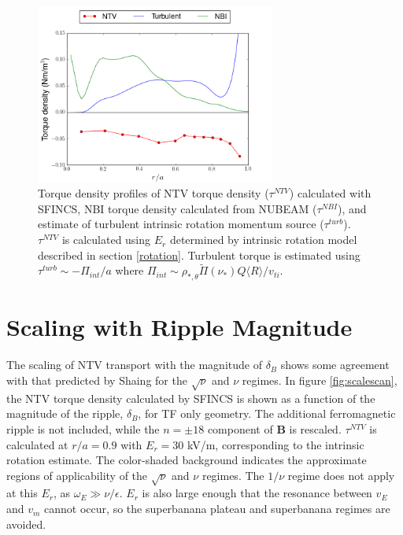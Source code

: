 \documentclass{article}
\numberwithin{figure}{section}
\numberwithin{equation}{section}
\begin{document}
\begin{figure}[h!]
\centering
\includegraphics[width=0.7\textwidth]{AllTorquePlot.png}
\caption{\label{fig:alltorque} Torque density profiles of NTV torque density ($\tau^{NTV}$) calculated with SFINCS, NBI torque density calculated from NUBEAM ($\tau^{NBI}$), and estimate of turbulent intrinsic rotation momentum source ($\tau^{turb}$). $\tau^{NTV}$ is calculated using $E_r$ determined by intrinsic rotation model described in section \ref{rotation}. Turbulent torque is estimated using $\tau^{turb} \sim -\Pi_{int}/a$ where $\Pi_{int} \sim \rho_{*, \theta} \widetilde{\Pi}(\nu_*) Q \langle R \rangle/v_{ti}$.}
\end{figure}

\FloatBarrier

\section{Scaling with Ripple Magnitude}\label{scaling}
The scaling of NTV transport with the magnitude of $\delta_B$ shows some agreement with that predicted by Shaing \cite{Shaing2008} for the $\sqrt{\nu}$ and $\nu$ regimes. In figure \ref{fig:scalescan}, the NTV torque density calculated by SFINCS is shown as a function of the magnitude of the ripple, $\delta_B$, for TF only geometry. The additional ferromagnetic ripple is not included, while the $n= \pm18$ component of $\bm{B}$ is rescaled. $\tau^{NTV}$ is calculated at $r/a = 0.9$ with $E_r = 30$ kV/m, corresponding to the intrinsic rotation estimate. The color-shaded background indicates the approximate regions of applicability of the $\sqrt{\nu}$ and $\nu$ regimes. The $1/\nu$ regime does not apply at this $E_r$, as $\omega_E \gg \nu/\epsilon$. $E_r$ is also large enough that the resonance between $v_{E}$ and $v_{m}$ cannot occur, so the superbanana plateau and superbanana regimes are avoided. 
\end{document}
